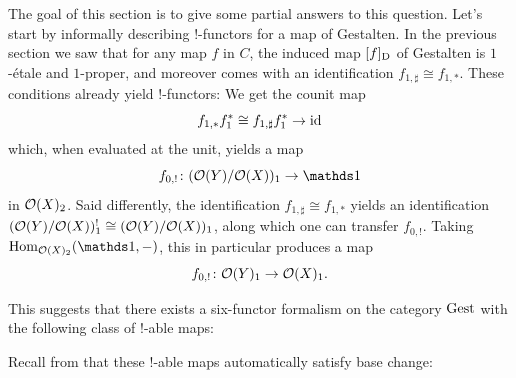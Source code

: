\documentclass[11pt]{book}
\begin{document}
	The goal of this section is to give some partial answers to this question. Let's start by informally describing $!$-functors for a map of Gestalten. In the previous section we saw that for any map $f$ in $C$, the induced map $[f]_{\operatorname{\mathrm{D}}}$ of Gestalten is $1$-étale and $1$-proper, and moreover comes with an identification $f_{1,\sharp} \cong f_{1,*}$. These conditions already yield $!$-functors: We get the counit map
	\[
		f_{1,*}f_1^* \cong f_{1,\sharp}f_1^* \to \operatorname{id}
	\]
	which, when evaluated at the unit, yields a map
	\[
		f_{0,!}\colon (\Oo(Y)/\Oo(X))_1 \to \unit
	\]
	in $\mathcal{O}(X)_2$. Said differently, the identification $f_{1,\sharp} \cong f_{1,*}$ yields an identification $(\mathcal{O}(Y)/\mathcal{O}(X))_1^! \cong (\mathcal{O}(Y)/\mathcal{O}(X))_1$, along which one can transfer $f_{0,!}$. Taking $\Hom_{\Oo(X)_2}(\unit,-)$, this in particular produces a map
	\[
		f_{0,!}\colon \mathcal{O}(Y)_1 \to \mathcal{O}(X)_1.
	\]
	
	This suggests that there exists a six-functor formalism on the category ${\textup{Gest}}$ with the following class of $!$-able maps:


	Recall from  that these $!$-able maps automatically satisfy base change:
\end{document}
